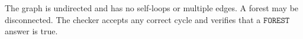 The graph is undirected and has no self-loops or multiple edges. A forest may be disconnected. The checker accepts any correct cycle and verifies that a $\texttt{FOREST}$ answer is true.
